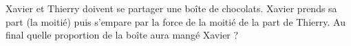 
\begin{exercice}\label{exosmath-0264}

Xavier et Thierry doivent se partager une boîte de chocolats. Xavier prends sa part (la moitié) puis s'empare par la force de la moitié de la part de Thierry. Au final quelle proportion de la boîte aura mangé Xavier ?

\end{exercice}
